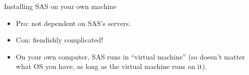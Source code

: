 \documentclass[unknownkeysallowed]{beamer}\usepackage[]{graphicx}\usepackage[]{color}
\begin{document}
%
%
%
% 
%
%
%
%
%  
%
%  
%
%
%
%
%
%
%
%


\begin{frame}[fragile]{Installing SAS on your own machine}

  \begin{itemize}
  \item Pro: not dependent on SAS's servers.
  \item Con: fiendishly complicated!
  \item On your own computer, SAS runs in ``virtual machine'' (so
    doesn't matter what OS you have, as long as the virtual machine
    runs on it).
  \end{itemize}
  
\end{frame}

\end{document}
